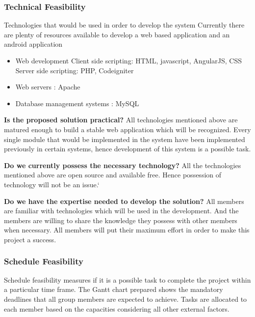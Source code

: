 \documentclass[a4paper,beamer]{article}
\begin{document}
	\subsubsection{Technical Feasibility}

	Technologies that would be used in order to develop the system
	Currently there are plenty of resources available to develop a web based application and an android application
	\begin{itemize}
		\item Web development
		Client side scripting: HTML, javascript, AngularJS, CSS
		Server side scripting: PHP, Codeigniter
		\item Web servers : Apache
		\item  Database management systems : MySQL
	\end{itemize}

	\noindent\textbf{Is the proposed solution practical?}\newline
	All technologies mentioned above are matured enough to build a stable web application which will be recognized. Every single module that would be implemented in the system have been implemented previously in certain systems, hence development of this system is a possible task.\newline
	
	\noindent\textbf{Do we currently possess the necessary technology?}\newline
	All the technologies mentioned above are open source and available free. Hence possession of technology will not be an issue.\newline`
	
	\noindent\textbf{Do we have the expertise needed to develop the solution?}\newline
	All members are familiar with technologies which will be used in the development. And the members are willing to share the knowledge they possess with other members when necessary. All members will put their maximum effort in order to make this project a success.\newline
	
	\subsubsection{Schedule Feasibility}
	Schedule feasibility measures if it is a possible task to complete the project within a particular time frame.\newline
	The Gantt chart prepared shows the mandatory deadlines that all group members are expected to achieve. Tasks are allocated to each member based on the capacities considering all other external factors. \newline
\end{document}
